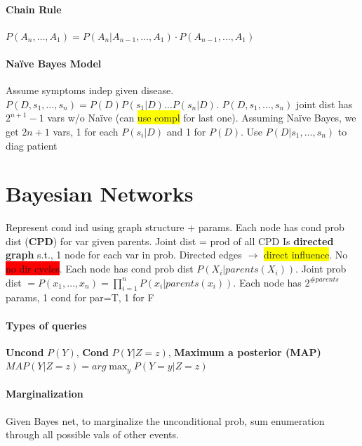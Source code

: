 \paragraph{Chain Rule}
$P(A_n,\ldots,A_1)=P(A_n|A_{n-1},\ldots,A_1)\cdot P(A_{n-1},\ldots,A_1)$
\paragraph{Na\"ive Bayes Model}
Assume symptoms indep given disease. $P(D,s_1,\ldots,s_n) =
P(D)P(s_1|D)\ldots P(s_n|D)$. $P(D,s_1,\ldots,s_n)$ joint dist has
$2^{n+1}-1$ vars w/o Na\"ive (can \colorbox{yellow}{use compl} for last
one). Assuming Na\"ive Bayes, we get $2n+1$ vars, 1 for each $P(s_i |
D)$ and 1 for $P(D)$. Use $P(D|s_1,\ldots,s_n)$ to diag patient

\color[HTML]{a7db26}
\section{Bayesian Networks}
Represent cond ind using graph structure + params. Each node has cond
prob dist (\textbf{CPD}) for var given parents. Joint dist = prod of
all CPD
Is \textbf{directed graph} s.t., 1 node for each var in prob. Directed edges
$\to$ \colorbox{yellow}{direct influence}. No \colorbox{red}{no dir
  cycles}. Each node has cond prob dist $P(X_i | parents(X_i))$. Joint
prob dist
$=P(x_1,\ldots,x_n)=\prod_{i=1}^{n}P(x_i|parents(x_i))$. Each node has
$2^{\# parents}$ params, 1 cond for par=T, 1 for F
\paragraph{Types of queries}
\textbf{Uncond} $P(Y)$, \textbf{Cond} $P(Y|Z=z)$, \textbf{Maximum
  a posterior (MAP)} $MAP(Y|Z=z) = arg\max_y P(Y=y | Z=z)$
\paragraph{Marginalization}
Given Bayes net, to marginalize the unconditional prob, sum enumeration
through all possible vals of other events.


